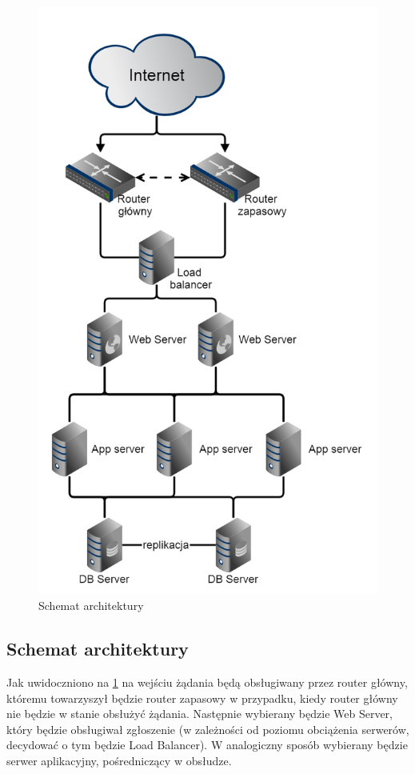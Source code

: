 \begin{figure}[H]
	\centering
	\includegraphics[scale=0.4]{img/architektura}
	\caption{Schemat architektury \label{fig:labelArchitecture}}
\end{figure}

\subsection{Schemat architektury}

Jak uwidoczniono na \ref*{fig:labelArchitecture} na wejściu żądania będą obsługiwany przez router główny, któremu towarzyszył będzie router zapasowy w przypadku, kiedy router główny nie będzie w stanie obsłużyć żądania. Następnie wybierany będzie Web Server, który będzie obsługiwał zgłoszenie (w zależności od poziomu obciążenia serwerów, decydować o tym będzie Load Balancer). W analogiczny sposób wybierany będzie serwer aplikacyjny, pośredniczący w obsłudze.

